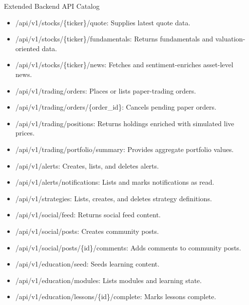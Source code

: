 \documentclass{beamer}
\begin{document}
\begin{frame}{Extended Backend API Catalog}
\begin{itemize}
\item /api/v1/stocks/\{ticker\}/quote: Supplies latest quote data.
\item /api/v1/stocks/\{ticker\}/fundamentals: Returns fundamentals and valuation-oriented data.
\item /api/v1/stocks/\{ticker\}/news: Fetches and sentiment-enriches asset-level news.
\item /api/v1/trading/orders: Places or lists paper-trading orders.
\item /api/v1/trading/orders/\{order\_id\}: Cancels pending paper orders.
\item /api/v1/trading/positions: Returns holdings enriched with simulated live prices.
\item /api/v1/trading/portfolio/summary: Provides aggregate portfolio values.
\item /api/v1/alerts: Creates, lists, and deletes alerts.
\item /api/v1/alerts/notifications: Lists and marks notifications as read.
\item /api/v1/strategies: Lists, creates, and deletes strategy definitions.
\item /api/v1/social/feed: Returns social feed content.
\item /api/v1/social/posts: Creates community posts.
\item /api/v1/social/posts/\{id\}/comments: Adds comments to community posts.
\item /api/v1/education/seed: Seeds learning content.
\item /api/v1/education/modules: Lists modules and learning state.
\item /api/v1/education/lessons/\{id\}/complete: Marks lessons complete.
\end{itemize}
\end{frame}
\end{document}
